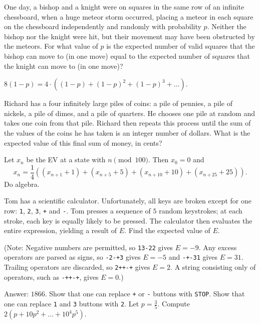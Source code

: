 \documentclass[11pt]{scrartcl}
\begin{document}
\begin{problem}[NIMO 4.3]
  One day, a bishop and a knight were on squares in the same row of an infinite chessboard, when a huge meteor storm occurred, placing a meteor in each square on the chessboard independently and randomly with probability $p$. Neither the bishop nor the knight were hit, but their movement may have been obstructed by the meteors.  For what value of $p$ is the expected number of valid squares that the bishop can move to (in one move) equal to the expected number of squares that the knight can move to (in one move)? %
  \begin{sketch}
    $8(1-p) = 4 \cdot \left( (1-p)+(1-p)^2+(1-p)^3+\dots \right)$.
  \end{sketch}
\end{problem}
\begin{problem}[NIMO 7.3]
  Richard has a four infinitely large piles of coins: a pile of pennies, a pile of nickels, a pile of dimes, and a pile of quarters. He chooses one pile at random and takes one coin from that pile. Richard then repeats this process until the sum of the values of the coins he has taken is an integer number of dollars.  What is the expected value of this final sum of money, in cents? %
  \begin{sketch}
    Let $x_n$ be the EV at a state with $n \pmod{100}$.
    Then $x_0 = 0$ and \[ x_n = \frac 14 \left( (x_{n+1}+1) + (x_{n+5}+5) + (x_{n+10}+10) + (x_{n+25}+25) \right). \]
    Do algebra.
  \end{sketch}
\end{problem}
\begin{problem}[NIMO 5.6]
  Tom has a scientific calculator. Unfortunately, all keys are broken except for one row: \verb$1$, \verb$2$, \verb$3$, \verb$+$ and \verb$-$.  Tom presses a sequence of $5$ random keystrokes; at each stroke, each key is equally likely to be pressed.  The calculator then evaluates the entire expression, yielding a result of $E$.  Find the expected value of $E$. \par (Note: Negative numbers are permitted, so \verb$13-22$ gives $E = -9$. Any excess operators are parsed as signs, so \verb$-2-+3$ gives $E=-5$ and \verb$-+-31$ gives $E = 31$.  Trailing operators are discarded, so \verb$2++-+$ gives $E=2$.  A string consisting only of operators, such as \verb$-++-+$, gives $E=0$.) %
  \begin{sketch}
    Answer: $1866$.
    Show that one can replace \verb$+$ or \verb$-$ buttons with \verb$STOP$.
    Show that one can replace \verb$1$ and \verb$3$ buttons with \verb$2$.
    Let $p = \frac 35$.  Compute $2(p + 10p^2 + \dots + 10^4p^5)$.
  \end{sketch}
\end{problem}
\end{document}
